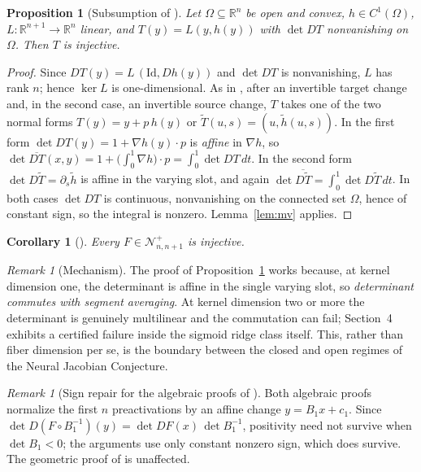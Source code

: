 \documentclass[11pt]{article}
\newtheorem{proposition}[theorem]{Proposition}
\newtheorem{corollary}[theorem]{Corollary}
\theoremstyle{definition}
\theoremstyle{remark}
\newtheorem{remark}[theorem]{Remark}
\newcommand{\R}{\mathbb{R}}
\begin{document}
\begin{proposition}[Subsumption of {\cite[Lemma~3.3]{moonshine}}]
\label{prop:subsume}
Let $\Omega\subseteq\R^n$ be open and convex, $h\in C^1(\Omega)$,
$L:\R^{n+1}\to\R^n$ linear, and $T(y)=L(y,h(y))$ with $\det DT$
nonvanishing on $\Omega$. Then $T$ is injective.
\end{proposition}
\begin{proof}
Since $DT(y)=L\,(\mathrm{Id},Dh(y))$ and $\det DT$ is nonvanishing,
$L$ has rank $n$; hence $\ker L$ is one-dimensional. As in
\cite{moonshine}, after an invertible
target change and, in the second case, an invertible source change, $T$
takes one of the two normal forms
$T(y)=y+p\,h(y)$ or $\widetilde T(u,s)=(u,\widetilde h(u,s))$.
In the first form $\det DT(y)=1+\nabla h(y)\cdot p$ is \emph{affine} in
$\nabla h$, so
$\det\overline{DT}(x,y)=1+\bigl(\int_0^1\nabla h\bigr)\cdot p
=\int_0^1\det DT\,dt$.
In the second form $\det D\widetilde T=\partial_s\widetilde h$ is affine in
the varying slot, and again
$\det\overline{D\widetilde T}=\int_0^1\det D\widetilde T\,dt$.
In both cases $\det DT$ is continuous, nonvanishing on the connected set
$\Omega$, hence of constant sign, so the integral is nonzero. Lemma~\ref{lem:mv}
applies.
\end{proof}

\begin{corollary}[{\cite[Theorem~3.2]{moonshine}}]
Every $F\in\mathcal N^{+}_{n,n+1}$ is injective.
\end{corollary}

\begin{remark}[Mechanism]\label{rem:mechanism}
The proof of Proposition~\ref{prop:subsume} works because, at kernel
dimension one, the determinant is affine in the single varying slot, so
\emph{determinant commutes with segment averaging}. At kernel dimension
two or more the determinant is genuinely multilinear and the commutation
can fail; Section~4 exhibits a certified failure inside the sigmoid ridge
class itself. This, rather than fiber dimension per se, is the boundary
between the closed and open regimes of the Neural Jacobian Conjecture.
\end{remark}

\begin{remark}[Sign repair for the algebraic proofs of \cite{moonshine}]
Both algebraic proofs normalize the first $n$ preactivations by an affine
change $y=B_1x+c_1$. Since
$\det D(F\circ B_1^{-1})(y)=\det DF(x)\,\det B_1^{-1}$,
positivity need not survive when $\det B_1<0$; the arguments use only
constant nonzero sign, which does survive. The geometric proof of
\cite{moonshine} is unaffected.
\end{remark}
\end{document}
